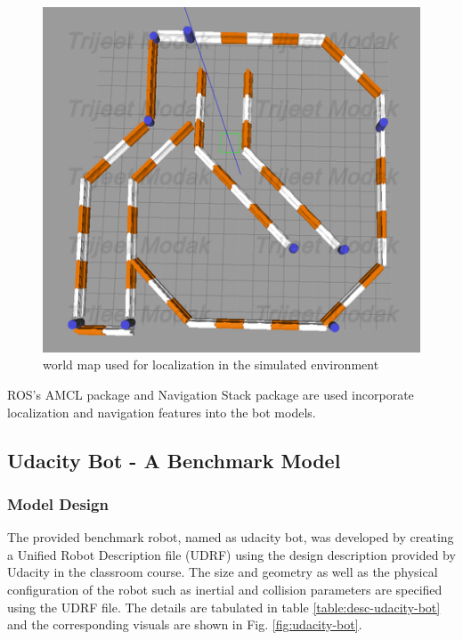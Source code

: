 \documentclass[10pt,journal,compsoc]{IEEEtran}
\begin{document}
\begin{figure}[h]
    \centering
    \includegraphics[scale=0.5]{imgs/map-jackal-race.png}
    \centering
    \caption{world map used for localization in the simulated environment}
    \label{fig:map-jackal-race}
\end{figure}

ROS's AMCL package and Navigation Stack package are used incorporate localization and navigation features into the bot models.

\subsection{Udacity Bot - A Benchmark Model}
\subsubsection{Model Design}
The provided benchmark robot, named as udacity bot, was developed by creating a Unified Robot Description file (UDRF) using the design description provided by Udacity in the classroom course. The size and geometry as well as the physical configuration of the robot such as inertial and collision parameters are specified using the UDRF file. The details are tabulated in table \ref{table:desc-udacity-bot} and the corresponding visuals are shown in Fig. \ref{fig:udacity-bot}.
\end{document}
